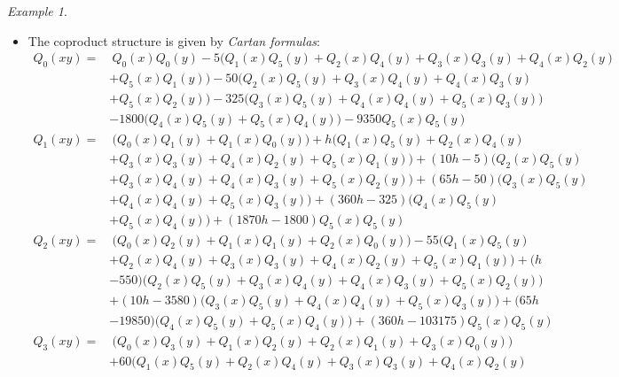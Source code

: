 \documentclass{gtpart}
\theoremstyle{definition}
\theoremstyle{remark}
\newtheorem{ex}[thm]{Example}
\renewcommand{\=}{\approx}
\renewcommand{\-}{\sim}
\numberwithin{equation}{section}
\numberwithin{thm}{section}
\begin{document}
\begin{ex}
\begin{itemize}
  \item The coproduct structure is given by {\em Cartan formulas}: 
  \begin{equation*}
   \begin{split}
    Q_0(x y) = & ~ Q_0(x) Q_0(y) - 5 \big( Q_1(x) Q_5(y) + Q_2(x) Q_4(y) + Q_3(x) Q_3(y) + Q_4(x) Q_2(y) \\
               & + Q_5(x) Q_1(y) \big) - 50 \big( Q_2(x) Q_5(y) + Q_3(x) Q_4(y) + Q_4(x) Q_3(y) \\
               & + Q_5(x) Q_2(y) \big) - 325 \big( Q_3(x) Q_5(y) + Q_4(x) Q_4(y) + Q_5(x) Q_3(y) \big) \\
               & - 1800 \big( Q_4(x) Q_5(y) + Q_5(x) Q_4(y) \big) - 9350 Q_5(x) Q_5(y) 
   \end{split}
  \end{equation*}
  \begin{equation*}
   \begin{split}
    Q_1(x y) = & ~ \big( Q_0(x) Q_1(y) + Q_1(x) Q_0(y) \big) + h \big( Q_1(x) Q_5(y) + Q_2(x) Q_4(y) \\
               & + Q_3(x) Q_3(y) + Q_4(x) Q_2(y) + Q_5(x) Q_1(y) \big) + (10 h - 5) \big( Q_2(x) Q_5(y) \\
               & + Q_3(x) Q_4(y) + Q_4(x) Q_3(y) + Q_5(x) Q_2(y) \big) + (65 h - 50) \big( Q_3(x) Q_5(y) \\
               & + Q_4(x) Q_4(y) + Q_5(x) Q_3(y) \big) + (360 h - 325) \big( Q_4(x) Q_5(y) \\
               & + Q_5(x) Q_4(y) \big) + (1870 h - 1800) Q_5(x) Q_5(y) \\
    Q_2(x y) = & ~ \big( Q_0(x) Q_2(y) + Q_1(x) Q_1(y) + Q_2(x) Q_0(y) \big) - 55 \big( Q_1(x) Q_5(y) \\
               & + Q_2(x) Q_4(y) + Q_3(x) Q_3(y) + Q_4(x) Q_2(y) + Q_5(x) Q_1(y) \big) + (h \\
               & - 550) \big( Q_2(x) Q_5(y) + Q_3(x) Q_4(y) + Q_4(x) Q_3(y) + Q_5(x) Q_2(y) \big) \\
               & + (10 h - 3580) \big( Q_3(x) Q_5(y) + Q_4(x) Q_4(y) + Q_5(x) Q_3(y) \big) + (65 h \\
               & - 19850) \big( Q_4(x) Q_5(y) + Q_5(x) Q_4(y) \big) + (360 h - 103175) Q_5(x) Q_5(y) \\
    Q_3(x y) = & ~ \big( Q_0(x) Q_3(y) + Q_1(x) Q_2(y) + Q_2(x) Q_1(y) + Q_3(x) Q_0(y) \big) \\
               & + 60 \big( Q_1(x) Q_5(y) + Q_2(x) Q_4(y) + Q_3(x) Q_3(y) + Q_4(x) Q_2(y) \\

\end{split}
\end{equation*}
\end{itemize}
\end{ex}
\end{document}
